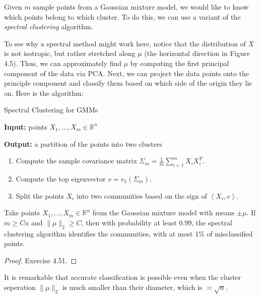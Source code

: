Given $m$ sample points from a Gaussian mixture model, we would like to know which points belong to which 
cluster. To do this, we can use a variant of the \textit{spectral clustering} algorithm.

To see why a spectral method might work here, notice that the distribution of $X$ is not isotropic, but rather 
stretched along $\mu$ (the horizontal direction in Figure 4.5). Thus, we can approximately find $\mu$ by 
computing the first principal component of the data via PCA. Next, we can project the data points onto the 
principle component and classify them based on which side of the origin they lie on. Here is the algorithm:

\begin{algorithm*}
	\caption{Spectral Clustering for GMMs}
	\label{alg:scgmm}
	\begin{algorithmic}
		\item \textbf{Input:} points $X_1, \dots, X_m \in \mathbb{R}^n$
		\item \textbf{Output:} a partition of the points into two clusters 
		\item \begin{enumerate}[label=\arabic*]
			\item Compute the sample covariance matrix $\Sigma_m = \frac{1}{m}\sum_{i = 1}^{m}X_iX_i^T$.
			\item Compute the top eigenvector $v = v_1(\Sigma_m)$.
			\item Split the points $X_i$ into two communities based on the sign of $\left\langle X_i, v
			\right\rangle$.
		\end{enumerate}
	\end{algorithmic}
\end{algorithm*}

\begin{theorem}
\label{thm:4.7.5}
Take points $X_1, \dots, X_m \in \mathbb{R}^n$ from the Gaussian mixture model with means $\pm \mu$. If 
$m \geq Cn$ and $\lVert \mu \rVert_{2} \geq C$, then with probability at least 0.99, the spectral clustering 
algorithm identifies the communities, with at most 1\% of misclassified points.
\end{theorem}

\begin{proof}
Exercise 4.51.
\end{proof}

It is remarkable that accurate classification is possible even when the cluster seperation $\lVert \mu 
\rVert_{2}$ is much smaller than their diameter, which is $\asymp \sqrt{n}$.


